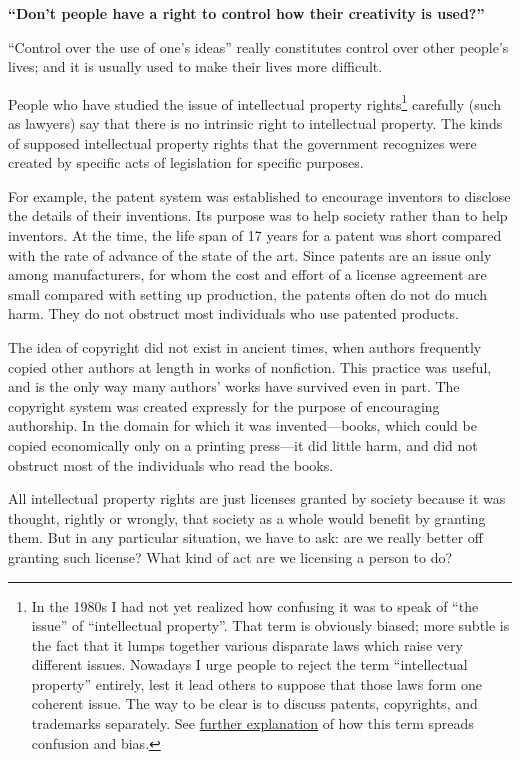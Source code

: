 \textbf{“Don't people have a right to control how their creativity is used?”}\par
“Control over the use of one's ideas” really constitutes control over other people's lives; and it is usually used to make their lives more difficult.\par
People who have studied the issue of intellectual property rights\footnote{In the 1980s I had not yet realized how confusing it was to speak of “the issue” of “intellectual property”. That term is obviously biased; more subtle is the fact that it lumps together various disparate laws which raise very different issues. Nowadays I urge people to reject the term “intellectual property” entirely, lest it lead others to suppose that those laws form one coherent issue. The way to be clear is to discuss patents, copyrights, and trademarks separately. See \href{http://www.gnu.org/philosophy/not-ipr.html}{further explanation} of how this term spreads confusion and bias.} carefully (such as lawyers) say that there is no intrinsic right to intellectual property. The kinds of supposed intellectual property rights that the government recognizes were created by specific acts of legislation for specific purposes.\par
For example, the patent system was established to encourage inventors to disclose the details of their inventions. Its purpose was to help society rather than to help inventors. At the time, the life span of 17 years for a patent was short compared with the rate of advance of the state of the art. Since patents are an issue only among manufacturers, for whom the cost and effort of a license agreement are small compared with setting up production, the patents often do not do much harm. They do not obstruct most individuals who use patented products.\par
The idea of copyright did not exist in ancient times, when authors frequently copied other authors at length in works of nonfiction. This practice was useful, and is the only way many authors' works have survived even in part. The copyright system was created expressly for the purpose of encouraging authorship. In the domain for which it was invented—books, which could be copied economically only on a printing press—it did little harm, and did not obstruct most of the individuals who read the books.\par
All intellectual property rights are just licenses granted by society because it was thought, rightly or wrongly, that society as a whole would benefit by granting them. But in any particular situation, we have to ask: are we really better off granting such license? What kind of act are we licensing a person to do?\par
